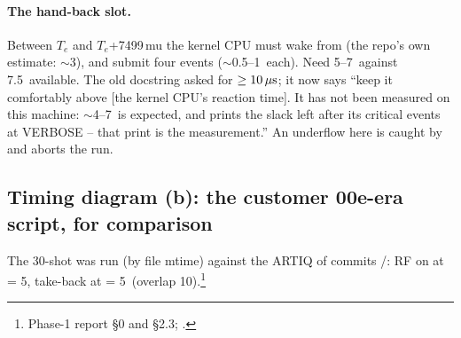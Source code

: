 \paragraph{The hand-back slot.} Between $T_e$ and $T_e$+7499\,mu the kernel
CPU must wake from  (the repo's own estimate: $\sim$3\us),
and submit four events ($\sim$0.5--1\us\ each). Need 5--7\us\ against
7.5\us\ available. The old  docstring asked for $\ge 10\,\mu\mathrm{s}$; it
now says ``keep it comfortably above [the kernel CPU's reaction time]. It
has not been measured on this machine: $\sim$4--7\us\ is expected, and
 prints the slack left
after its critical events at VERBOSE -- that print is the measurement.'' An
underflow here is caught by  and aborts the run.

\subsection{Timing diagram (b): the customer 00e-era script, for comparison}
\label{sec:handoff:diag_b}

The 30-shot 
was run (by file mtime) against the ARTIQ of commits
/: RF on at  =
5\us, take-back at  = 5\us\ (overlap 10\us).\footnote{Phase-1
report  \S0 and \S2.3; .}


